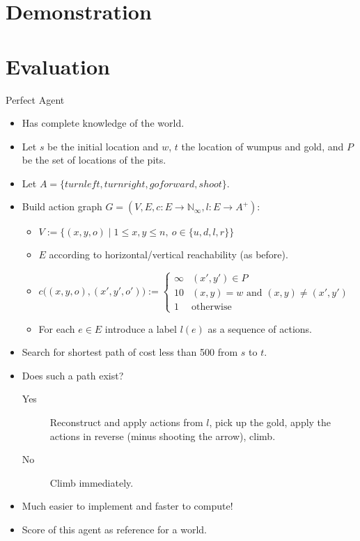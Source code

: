 \documentclass[smaller,dvipsnames,ratio=169,10pt]{beamer}
\begin{document}
  \section{Demonstration}
  
	\begin{frame}[standout]
	\end{frame}

  \section{Evaluation}
  
  \begin{frame}[allowframebreaks]{Perfect Agent}
    \begin{itemize}
      \item Has complete knowledge of the world.
      \item Let $s$ be the initial location and $w$, $t$ the location of wumpus and gold, and $P$ be the set of locations of the pits.
      \item Let $A = \{ turnleft, turnright, goforward, shoot \}$.
      \item Build action graph $G = (V, E, c : E \rightarrow \mathbb{N}_{\infty}, l : E \rightarrow A^+)$:
      \begin{itemize}
      	\item $V := \big\{ (x, y, o) \mid 1 \leq x, y \leq n, \: o \in \{ u, d, l, r\} \big\}$
      	\item $E$ according to horizontal/vertical reachability (as before).
      	\item $c{\big(}(x, y, o), (x', y', o'){\big)} := \begin{cases} \infty & (x', y') \in P \\ 10 & (x,y) = w \text{ and } (x,y) \neq (x',y') \\ 1 & \text{otherwise} \end{cases}$
      	\item For each $e \in E$ introduce a label $l(e)$ as a sequence of actions.
      \end{itemize}

	  \framebreak      
      
      \item Search for shortest path of cost less than 500 from $s$ to $t$.
      \item Does such a path exist? \begin{description}
      	\item[Yes]{Reconstruct and apply actions from $l$, pick up the gold, apply the actions in reverse (minus shooting the arrow), climb.}
      	\item[No]{Climb immediately.}
      \end{description}
      \item Much easier to implement and faster to compute!
      \item Score of this agent as reference for a world.
    \end{itemize}
  \end{frame}
\end{document}
